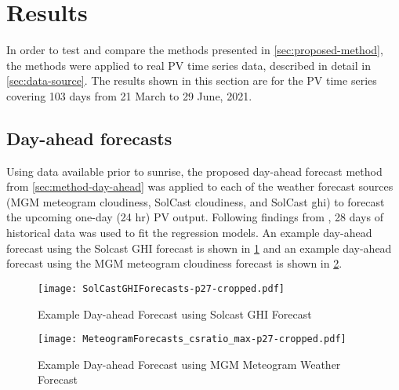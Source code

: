\section{Results}
\label{sec:results}

In order to test and compare the methods presented in \cref{sec:proposed-method},
the methods were applied to real PV time series data, described in detail in \cref{sec:data-source}.
The results shown in this section are for the PV time series covering
103 days from 21 March to 29 June, 2021.

\subsection{Day-ahead forecasts}

Using data available prior to sunrise, the proposed day-ahead forecast method from  \cref{sec:method-day-ahead} was applied to each of the weather forecast sources
(MGM meteogram cloudiness, SolCast cloudiness, and SolCast ghi)
to forecast the upcoming one-day (24 hr) PV output.
Following findings from \cite{Almeida2015},
28 days of historical data was used to fit the regression models.
An example day-ahead forecast using the Solcast GHI forecast is shown in \cref{fig:dayahead-forecast-solcast}
and an example day-ahead forecast using the MGM meteogram cloudiness forecast is shown in \cref{fig:dayahead-forecast-meteogram}.

\begin{figure}[!ht]
	\centering
	\texttt{[image: SolCastGHIForecasts-p27-cropped.pdf]}
	\caption{Example Day-ahead Forecast using Solcast GHI Forecast}
	\label{fig:dayahead-forecast-solcast}
\end{figure}


\begin{figure}[tbh]
	\centering
	\texttt{[image: MeteogramForecasts\_csratio\_max-p27-cropped.pdf]}
	\caption{Example Day-ahead Forecast using MGM Meteogram Weather Forecast}
	\label{fig:dayahead-forecast-meteogram}
\end{figure}

